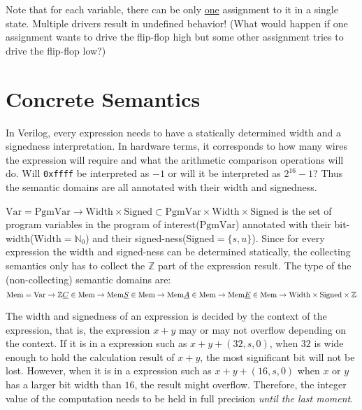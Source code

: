 \documentclass[fleqn]{article}
\theoremstyle{definition}
\begin{document}
Note that for each variable, there can be only \underline{one} assignment to it in a single state. Multiple drivers result in undefined behavior! (What would happen if one assignment wants to drive the flip-flop high but some other assignment tries to drive the flip-flop low?)

\section{Concrete Semantics}
In Verilog, every expression needs to have a statically determined width and a signedness interpretation. In hardware terms, it corresponds to how many wires the expression will require and what the arithmetic comparison operations will do. Will \texttt{0xffff} be interpreted as $-1$ or will it be interpreted as $2^{16}-1$? Thus the semantic domains are all annotated with their width and signedness.

$\text{Var}=\text{PgmVar}\rightarrow\text{Width}\times\text{Signed}\subset\text{PgmVar}\times\text{Width}\times\text{Signed}$ is the set of program variables in the program of interest($\text{PgmVar}$) annotated with their bit-width($\text{Width}=\mathbb{N}_{0}$) and their signed-ness($\text{Signed}=\{s,u\}$). Since for every expression the width and signed-ness can be determined statically, the collecting semantics only has to collect the $\mathbb{Z}$ part of the expression result. The type of the (non-collecting) semantic domains are:
\[
  \text{Mem}=\text{Var}\rightarrow\mathbb{Z}\\
  \underline{C}\in\text{Mem}\rightarrow\text{Mem}\\
  \underline{S}\in\text{Mem}\rightarrow\text{Mem}\\
  \underline{A}\in\text{Mem}\rightarrow\text{Mem}\\
  \underline{E}\in\text{Mem}\rightarrow\text{Width}\times\text{Signed}\times\mathbb{Z}
\]

The width and signedness of an expression is decided by the context of the expression, that is, the expression $x+y$ may or may not overflow depending on the context. If it is in a expression such as $x+y+(32,s,0)$, when $32$ is wide enough to hold the calculation result of $x+y$, the most significant bit will not be lost. However, when it is in a expression such as $x+y+(16,s,0)$ when $x$ or $y$ has a larger bit width than $16$, the result might overflow. Therefore, the integer value of the computation needs to be held in full precision \textit{until the last moment}.
\end{document}
